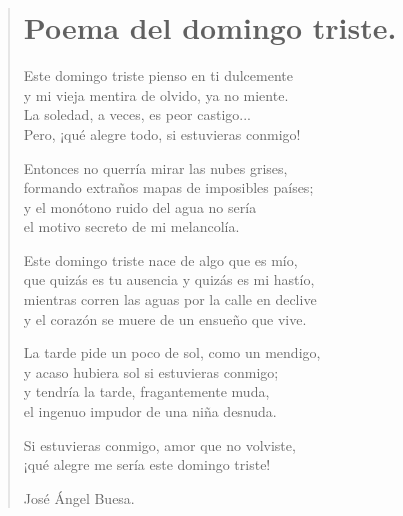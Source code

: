 \documentclass[11pt, portrait, twoside, notitlepage, openright]{book}
\begin{document}
\newpage
\begin{verse}
\begin{center}
\section{Poema del domingo triste.}
\end{center}
Este domingo triste pienso en ti dulcemente\\
y mi vieja mentira de olvido, ya no miente.\\
La soledad, a veces, es peor castigo...\\
Pero, ¡qué alegre todo, si estuvieras conmigo!
\newline

Entonces no querría mirar las nubes grises,\\
formando extraños mapas de imposibles países;\\
y el monótono ruido del agua no sería\\
el motivo secreto de mi melancolía.
\newline

Este domingo triste nace de algo que es mío,\\
que quizás es tu ausencia y quizás es mi hastío,\\
mientras corren las aguas por la calle en declive\\
y el corazón se muere de un ensueño que vive.
\newline

La tarde pide un poco de sol, como un mendigo,\\
y acaso hubiera sol si estuvieras conmigo;\\
y tendría la tarde, fragantemente muda,\\
el ingenuo impudor de una niña desnuda.
\newline

Si estuvieras conmigo, amor que no volviste,\\
¡qué alegre me sería este domingo triste!
\newline

\begin{flushright}
José Ángel Buesa.
\end{flushright}
\end{verse}
\end{document}
